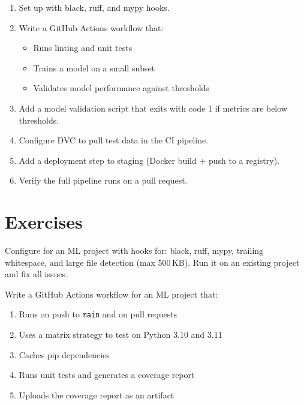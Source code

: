 \begin{miniproject}[title=\textbf{Mini-project 9: CI/CD for ML}]
\begin{enumerate}
  \item Set up  with black, ruff, and mypy hooks.
  \item Write a GitHub Actions workflow that:
    \begin{itemize}
      \item Runs linting and unit tests
      \item Trains a model on a small subset
      \item Validates model performance against thresholds
    \end{itemize}
  \item Add a model validation script that exits with code 1 if
    metrics are below thresholds.
  \item Configure DVC to pull test data in the CI pipeline.
  \item Add a deployment step to staging (Docker build + push to a
    registry).
  \item Verify the full pipeline runs on a pull request.
\end{enumerate}
\end{miniproject}

\section{Exercises}
\label{sec:exercises-ch9}

\begin{exercise}
Configure  for an ML project with hooks for:
black, ruff, mypy, trailing whitespace, and large file detection
(max 500\,KB). Run it on an existing project and fix all issues.
\end{exercise}

\begin{exercise}
Write a GitHub Actions workflow for an ML project that:
\begin{enumerate}
  \item Runs on push to \texttt{main} and on pull requests
  \item Uses a matrix strategy to test on Python 3.10 and 3.11
  \item Caches pip dependencies
  \item Runs unit tests and generates a coverage report
  \item Uploads the coverage report as an artifact
\end{enumerate}
\end{exercise}

